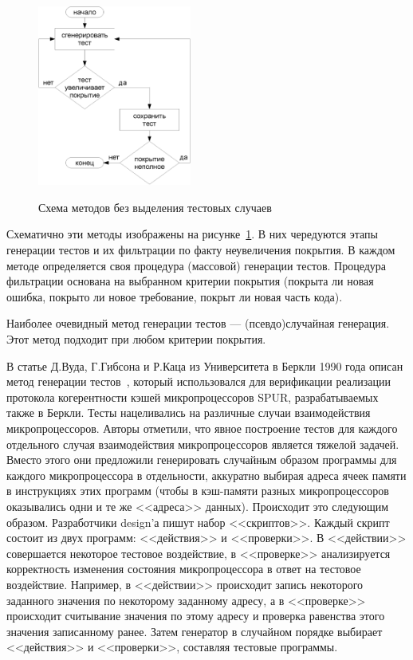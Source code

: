 \documentclass[14pt]{extreport}
\begin{document}
\begin{figure}[h] \center
  \includegraphics[width=0.45\textwidth]{1.review/methods1}\\
  \caption{Схема методов без выделения тестовых случаев}\label{fig:methods1}
\end{figure}

Схематично эти методы изображены на рисунке~\ref{fig:methods1}. В них чередуются этапы генерации тестов и их фильтрации по факту неувеличения покрытия. В каждом методе определяется своя процедура (массовой) генерации тестов. Процедура фильтрации основана на выбранном критерии покрытия (покрыта ли новая ошибка, покрыто ли новое требование, покрыт ли новая часть кода).

Наиболее очевидный метод генерации тестов --- (псевдо)случайная генерация. Этот метод подходит при любом критерии покрытия.


В статье Д.Вуда, Г.Гибсона и Р.Каца из Университета в Беркли 1990 года описан метод генерации тестов~\cite{Berkeley89}, который использовался для верификации реализации протокола когерентности кэшей микропроцессоров SPUR, разрабатываемых также в Беркли. Тесты нацеливались на различные случаи взаимодействия микропроцессоров. Авторы отметили, что явное построение тестов для каждого отдельного случая взаимодействия микропроцессоров является тяжелой задачей. Вместо этого они предложили генерировать случайным образом программы для каждого микропроцессора в отдельности, аккуратно выбирая адреса ячеек памяти в инструкциях этих программ (чтобы в кэш-памяти разных микропроцессоров оказывались одни и те же <<адреса>> данных). Происходит это следующим образом. Разработчики design'а пишут набор <<скриптов>>. Каждый скрипт состоит из двух программ: <<действия>> и <<проверки>>. В <<действии>> совершается некоторое тестовое воздействие, в <<проверке>> анализируется корректность изменения состояния микропроцессора в ответ на тестовое воздействие. Например, в <<действии>> происходит запись некоторого заданного значения по некоторому заданному адресу, а в <<проверке>> происходит считывание значения по этому адресу и проверка равенства этого значения записанному ранее. Затем генератор в случайном порядке выбирает <<действия>> и <<проверки>>, составляя тестовые программы.
\end{document}
